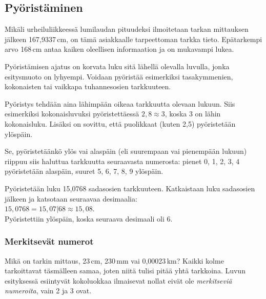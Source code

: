 \subsection*{Pyöristäminen}

Mikäli urheiluliikkeessä lumilaudan pituudeksi ilmoitetaan tarkan mittauksen jälkeen 167,9337\,cm, on tämä asiakkaalle tarpeettoman tarkka tieto. Epätarkempi arvo 168\,cm antaa kaiken oleellisen informaation ja on mukavampi lukea.

Pyöristämisen ajatus on korvata luku sitä lähellä olevalla luvulla, jonka esitysmuoto on lyhyempi. Voidaan pyöristää esimerkiksi tasakymmenien, kokonaisten tai vaikkapa tuhannesosien tarkkuuteen.

Pyöristys tehdään aina lähimpään oikeaa tarkkuutta olevaan lukuun. Siis esimerkiksi kokonaisluvuksi pyöristettäessä $2,8 \approx 3$, koska 3 on lähin kokonaisluku. Lisäksi on sovittu, että puolikkaat (kuten 2,5) pyöristetään ylöspäin.

Se, pyöristetäänkö ylös vai alaspäin (eli suurempaan vai pienempään lukuun) riippuu siis haluttua tarkkuutta seuraavasta numerosta: pienet 0, 1, 2, 3, 4 pyöristetään alaspäin, suuret 5, 6, 7, 8, 9 ylöspäin.

\begin{esimerkki}
Pyöristetään luku 15,0768 sadasosien tarkkuuteen. Katkaistaan luku sadasosien jälkeen ja katsotaan seuraavaa desimaalia:\\
$15,0768 = 15,07|68 \approx 15,08$.\\
Pyöristettiin ylöspäin, koska seuraava desimaali oli 6.
\end{esimerkki}


\subsubsection*{Merkitsevät numerot}

Mikä on tarkin mittaus, 23\,cm, 230\,mm vai 0,00023\,km? Kaikki kolme tarkoittavat täsmälleen samaa, joten niitä tulisi pitää
yhtä tarkkoina. Luvun esityksessä esiintyvät kokoluokkaa ilmaisevat nollat eivät ole \emph{merkitseviä numeroita}, vain 2 ja 3 ovat.


